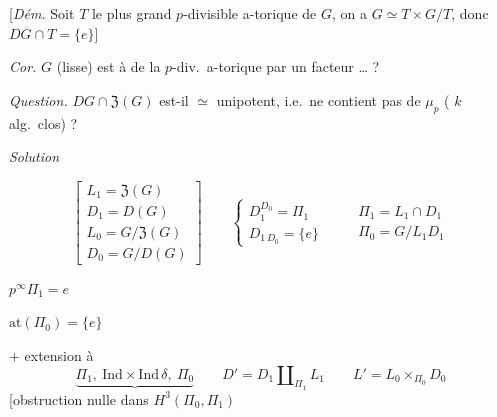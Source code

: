 \documentclass[11pt,a4paper]{article}
\begin{document}
[\emph{Dém.} Soit \struck{\ill{}} $T$ le plus grand
 $p$-divisible a-torique de $G$, on a
$G \simeq T \times G/T$, donc $DG \cap T = \{e\}$]

\emph{Cor.} $G$ (lisse) est  \struck{\ill{}} à
 de la  $p$-div.\ a-torique par un facteur … ?

\emph{Question.} $DG \cap \mathfrak{Z}(G)$ est-il $\simeq$
unipotent, i.e.\ ne contient pas de $\mu_p$ ( $k$ alg.\ clos) ?

\emph{Solution}



\[
  \begin{bmatrix}
    L_1 = \mathfrak{Z}(G) \\
    D_1 = D(G) \\
    L_0 = G/\mathfrak{Z}(G) \\
    D_0 = G/D(G)
  \end{bmatrix}
  \qquad
  \begin{cases}
    D_1^{D_0} = \Pi_1 \\
    D_{1\,D_0} = \{e\}
  \end{cases}
  \qquad
  \begin{array}{l}
    \Pi_1 = L_1 \cap D_1 \\
    \Pi_0 = G/L_1 D_1
  \end{array}
\]

$p^{\infty}\Pi_1 = e$

$\mathrm{at}(\Pi_0) = \{e\}$

+ extension  à 
\[
  \underbrace{\Pi_1, \ \mathrm{Ind} \times \mathrm{Ind}\,\delta, \ \Pi_0}
  \qquad
  D' = D_1 \amalg_{\Pi_1} L_1 \qquad L' = L_0 \times_{\Pi_0} D_0
\]
[obstruction nulle dans $H^3(\Pi_0, \Pi_1)$
\end{document}
